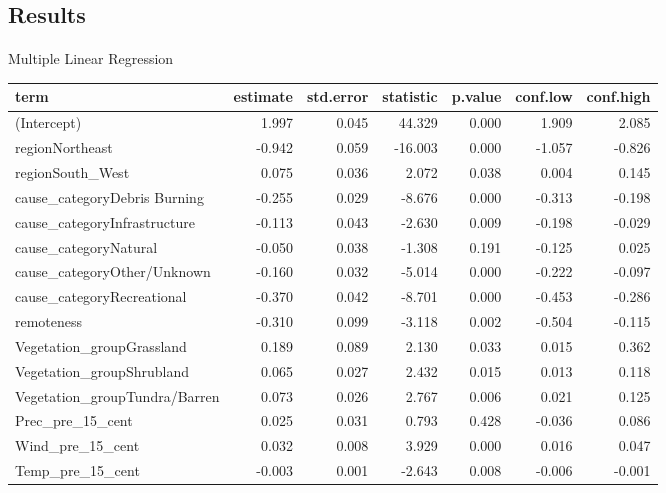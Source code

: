 \documentclass[
  letterpaper,
  DIV=11,
  numbers=noendperiod]{scrartcl}
\makeatletter
\let\oldparagraph\paragraph
\renewcommand{\paragraph}{
    \@ifstar
      \xxxParagraphStar
      \xxxParagraphNoStar
  }
\newcommand{\xxxParagraphStar}[1]{\oldparagraph*{#1}\mbox{}}
\newcommand{\xxxParagraphNoStar}[1]{\oldparagraph{#1}\mbox{}}
\makeatother
\begin{document}
\subsection{Results}\label{results}

\paragraph{Multiple Linear
Regression}\label{multiple-linear-regression-1}

\begin{table}[!h]
\centering\begingroup\fontsize{7}{9}\selectfont

\begin{tabular}{lrrrrrr}
\toprule
term & estimate & std.error & statistic & p.value & conf.low & conf.high\\
\midrule
(Intercept) & 1.997 & 0.045 & 44.329 & 0.000 & 1.909 & 2.085\\
regionNortheast & -0.942 & 0.059 & -16.003 & 0.000 & -1.057 & -0.826\\
regionSouth\_West & 0.075 & 0.036 & 2.072 & 0.038 & 0.004 & 0.145\\
cause\_categoryDebris Burning & -0.255 & 0.029 & -8.676 & 0.000 & -0.313 & -0.198\\
cause\_categoryInfrastructure & -0.113 & 0.043 & -2.630 & 0.009 & -0.198 & -0.029\\
\addlinespace
cause\_categoryNatural & -0.050 & 0.038 & -1.308 & 0.191 & -0.125 & 0.025\\
cause\_categoryOther/Unknown & -0.160 & 0.032 & -5.014 & 0.000 & -0.222 & -0.097\\
cause\_categoryRecreational & -0.370 & 0.042 & -8.701 & 0.000 & -0.453 & -0.286\\
remoteness & -0.310 & 0.099 & -3.118 & 0.002 & -0.504 & -0.115\\
Vegetation\_groupGrassland & 0.189 & 0.089 & 2.130 & 0.033 & 0.015 & 0.362\\
\addlinespace
Vegetation\_groupShrubland & 0.065 & 0.027 & 2.432 & 0.015 & 0.013 & 0.118\\
Vegetation\_groupTundra/Barren & 0.073 & 0.026 & 2.767 & 0.006 & 0.021 & 0.125\\
Prec\_pre\_15\_cent & 0.025 & 0.031 & 0.793 & 0.428 & -0.036 & 0.086\\
Wind\_pre\_15\_cent & 0.032 & 0.008 & 3.929 & 0.000 & 0.016 & 0.047\\
Temp\_pre\_15\_cent & -0.003 & 0.001 & -2.643 & 0.008 & -0.006 & -0.001\\

\end{tabular}
\end{table}
\end{document}
